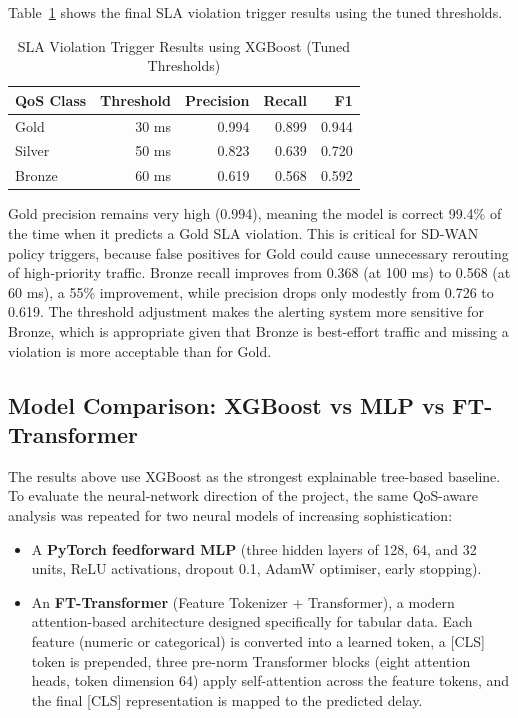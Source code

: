 \documentclass[a4paper,12pt]{Classes/RoboticsLaTeX}
\begin{document}
Table~\ref{tab:sla_precision} shows the final SLA violation trigger results using the tuned thresholds.

\begin{table}[H]
\centering
\caption{SLA Violation Trigger Results using XGBoost (Tuned Thresholds)}
\label{tab:sla_precision}
\begin{tabular}{|l|r|r|r|r|}
\hline
\textbf{QoS Class} & \textbf{Threshold} & \textbf{Precision} & \textbf{Recall} & \textbf{F1} \\
\hline
Gold & 30 ms & 0.994 & 0.899 & 0.944 \\
\hline
Silver & 50 ms & 0.823 & 0.639 & 0.720 \\
\hline
Bronze & 60 ms & 0.619 & 0.568 & 0.592 \\
\hline
\end{tabular}
\end{table}

Gold precision remains very high (0.994), meaning the model is correct 99.4\% of the time when it predicts a Gold SLA violation. This is critical for SD-WAN policy triggers, because false positives for Gold could cause unnecessary rerouting of high-priority traffic. Bronze recall improves from 0.368 (at 100 ms) to 0.568 (at 60 ms), a 55\% improvement, while precision drops only modestly from 0.726 to 0.619. The threshold adjustment makes the alerting system more sensitive for Bronze, which is appropriate given that Bronze is best-effort traffic and missing a violation is more acceptable than for Gold.

\subsection{Model Comparison: XGBoost vs MLP vs FT-Transformer}

The results above use XGBoost as the strongest explainable tree-based baseline. To evaluate the neural-network direction of the project, the same QoS-aware analysis was repeated for two neural models of increasing sophistication:

\begin{itemize}
    \item A \textbf{PyTorch feedforward MLP} (three hidden layers of 128, 64, and 32 units, ReLU activations, dropout 0.1, AdamW optimiser, early stopping).
    \item An \textbf{FT-Transformer} (Feature Tokenizer + Transformer), a modern attention-based architecture designed specifically for tabular data. Each feature (numeric or categorical) is converted into a learned token, a [CLS] token is prepended, three pre-norm Transformer blocks (eight attention heads, token dimension 64) apply self-attention across the feature tokens, and the final [CLS] representation is mapped to the predicted delay.
\end{itemize}
\end{document}
